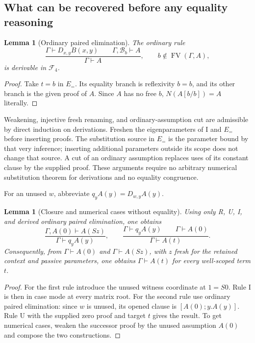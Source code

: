 \documentclass[11pt,letterpaper]{article}
\newtheorem{lemma}[theorem]{Lemma}
\theoremstyle{definition}\newtheorem{definition}[theorem]{Definition}
\theoremstyle{remark}\newtheorem{remark}[theorem]{Remark}
\begin{document}
\subsection{What can be recovered before any equality reasoning}

\begin{lemma}[Ordinary paired elimination]
\label{fus:ordinary-elim}
The ordinary rule
\[
 \frac{\Gamma\vdash D_{x,y}B(x,y)\qquad
       \Gamma,\mathcal B_b\vdash A}
      {\Gamma\vdash A},\qquad b\notin\operatorname{FV}(\Gamma,A),
\]
is derivable in $\mathcal F_4$.
\end{lemma}
\begin{proof}
Take $t=b$ in $E_{=}$. Its equality branch is reflexivity $b=b$, and its
other branch is the given proof of $A$. Since $A$ has no free $b$,
$N(A[b/b])=A$ literally.
\end{proof}

Weakening, injective fresh renaming, and ordinary-assumption cut are
admissible by direct induction on derivations. Freshen the eigenparameters
of I and $E_{=}$ before inserting proofs. The substitution source in
$E_{=}$ is the parameter bound by that very inference; inserting additional
parameters outside its scope does not change that source. A cut of an
ordinary assumption replaces uses of its constant clause by the supplied
proof. These arguments require no arbitrary numerical substitution theorem
for derivations and no equality congruence.

For an unused $w$, abbreviate $q_yA(y)=D_{w,y}A(y)$.
\begin{lemma}[Closure and numerical cases without equality]
\label{fus:cases}
Using only R, U, I, and derived ordinary paired elimination, one obtains
\[
 \frac{\Gamma,A(0)\vdash A(Sz)}{\Gamma\vdash q_yA(y)},
 \qquad
 \frac{\Gamma\vdash q_yA(y)\qquad\Gamma\vdash A(0)}
      {\Gamma\vdash A(t)}.
\]
Consequently, from $\Gamma\vdash A(0)$ and $\Gamma\vdash A(Sz)$, with
$z$ fresh for the retained context and passive parameters, one obtains
$\Gamma\vdash A(t)$ for every well-scoped term $t$.
\end{lemma}
\begin{proof}
For the first rule introduce the unused witness coordinate at $1=S0$.
Rule I is then in case mode at every matrix root. For the second rule use
ordinary paired elimination: since $w$ is unused, its opened clause is
$[A(0);y.A(y)]$. Rule U with the supplied zero proof and target $t$ gives
the result. To get numerical cases, weaken the successor proof by the unused
assumption $A(0)$ and compose the two constructions.
\end{proof}
\end{document}
